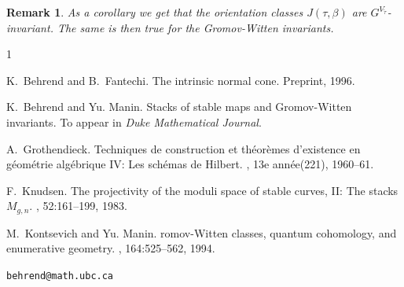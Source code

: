 \documentclass{article}
\newtheorem{rmkp}{Remark}\renewcommand{\thermkp}{}
\newenvironment{rmk}{\begin{rmkp}\rm}{\end{rmkp}}
\renewcommand{\tilde}{\widetilde}
\begin{document}
\begin{rmk}
As a corollary we get that the orientation classes $J(\tau,\beta)$ are
$G^{V_{\tilde{\tau}}}$-invariant. The same is then true for the
Gromov-Witten invariants.
\end{rmk}


%
%

\begin{thebibliography}{1}

K.~Behrend and B.~Fantechi.
\newblock The intrinsic normal cone.
\newblock Preprint, 1996.

K.~Behrend and Yu. Manin.
\newblock Stacks of stable maps and {G}romov-{W}itten invariants.
\newblock To appear in {\em Duke Mathematical Journal}.

A.~Grothendieck.
\newblock Techniques de construction et th\'eor\`emes d'existence en
  g\'eom\'etrie alg\'ebrique {IV}: Les sch\'emas de {H}ilbert.
, 13e ann\'ee(221), 1960--61.

F.~Knudsen.
\newblock The projectivity of the moduli space of stable curves, {I}{I}: The
  stacks ${M}_{g,n}$.
, 52:161--199, 1983.

M.~Kontsevich and Yu. Manin.
romov-{W}itten classes, quantum cohomology, and enumerative
  geometry.
, 164:525--562, 1994.

\end{thebibliography}

\begin{flushleft}
{\tt behrend@math.ubc.ca}
\end{flushleft}
\end{document}
